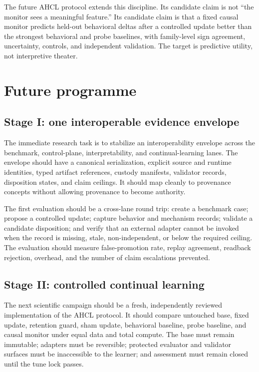 \documentclass[11pt,twoside]{article}
\begin{document}
  The future AHCL protocol extends this discipline. Its candidate claim is not ``the monitor sees a meaningful feature.'' Its candidate claim is that a fixed causal monitor predicts held-out behavioral deltas after a controlled update better than the strongest behavioral and probe baselines, with family-level sign agreement, uncertainty, controls, and independent validation. The target is predictive utility, not interpretive theater.

\section{Future programme}

\subsection{Stage I: one interoperable evidence envelope}

  The immediate research task is to stabilize an interoperability envelope across the benchmark, control-plane, interpretability, and continual-learning lanes. The envelope should have a canonical serialization, explicit source and runtime identities, typed artifact references, custody manifests, validator records, disposition states, and claim ceilings. It should map cleanly to provenance concepts without allowing provenance to become authority.

  The first evaluation should be a cross-lane round trip: create a benchmark case; propose a controlled update; capture behavior and mechanism records; validate a candidate disposition; and verify that an external adapter cannot be invoked when the record is missing, stale, non-independent, or below the required ceiling. The evaluation should measure false-promotion rate, replay agreement, readback rejection, overhead, and the number of claim escalations prevented.

\subsection{Stage II: controlled continual learning}

  The next scientific campaign should be a fresh, independently reviewed implementation of the AHCL protocol. It should compare untouched base, fixed update, retention guard, sham update, behavioral baseline, probe baseline, and causal monitor under equal data and total compute. The base must remain immutable; adapters must be reversible; protected evaluator and validator surfaces must be inaccessible to the learner; and assessment must remain closed until the tune lock passes.
\end{document}
